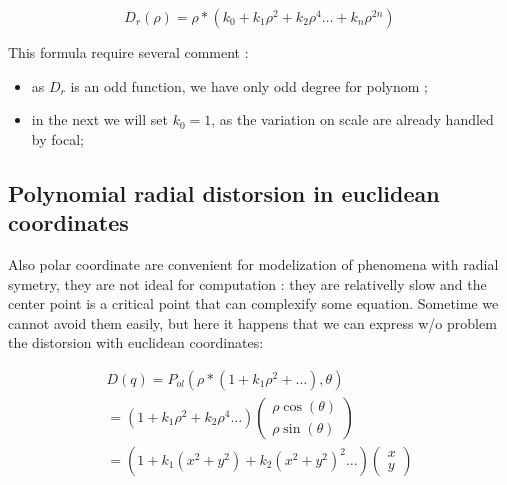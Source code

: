 \begin{equation}
	D_r(\rho)  =   \rho  * (k_0 + k_1 \rho^ 2 + k_2 \rho^4 \dots  + k_n \rho^{2n})
\end{equation}

This formula require several comment :

\begin{itemize}
    \item  as $D_r$ is an odd function, we have only odd degree for polynom ; 

    \item  in the next we will set $k_0=1$, as the variation on scale are already handled by focal;
\end{itemize}


\subsection{Polynomial radial distorsion in euclidean coordinates}

Also polar coordinate are convenient for modelization of phenomena with radial symetry, 
they are not ideal for computation : they are relativelly slow and  the center point is
a critical point that can complexify some equation.  Sometime we cannot avoid them
easily, but here it happens that we can express w/o problem the distorsion
with euclidean coordinates:

\begin{equation}
\begin{multlined}
D(q)  =   P_{ol}(\rho  * (1 + k_1 \rho^ 2 + \dots) ,\theta)  \\
=   (1 + k_1 \rho^ 2 +  k_2 \rho^ 4 \dots)  \begin{pmatrix} \rho\cos(\theta) \\ \rho \sin(\theta) \end{pmatrix} \\
=   (1 + k_1 (x^2+y^2) +  k_2 (x^2+y^2) ^2 \dots)  \begin{pmatrix} x \\ y \end{pmatrix}
\end{multlined}
\end{equation}




